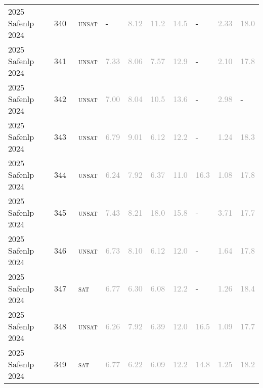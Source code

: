 \begin{center}
{\begin{longtable}{@{}llllllllll@{}}
2025 Safenlp 2024 & 340 & ~\textsc{unsat} & - & \textcolor{darkgray}{8.12} & \textcolor{darkgray}{11.2} & \textcolor{darkgray}{14.5} & - & \textcolor{darkgray}{2.33} & \textcolor{darkgray}{18.0} \\
2025 Safenlp 2024 & 341 & ~\textsc{unsat} & \textcolor{darkgray}{7.33} & \textcolor{darkgray}{8.06} & \textcolor{darkgray}{7.57} & \textcolor{darkgray}{12.9} & - & \textcolor{darkgray}{2.10} & \textcolor{darkgray}{17.8} \\
2025 Safenlp 2024 & 342 & ~\textsc{unsat} & \textcolor{darkgray}{7.00} & \textcolor{darkgray}{8.04} & \textcolor{darkgray}{10.5} & \textcolor{darkgray}{13.6} & - & \textcolor{darkgray}{2.98} & - \\
2025 Safenlp 2024 & 343 & ~\textsc{unsat} & \textcolor{darkgray}{6.79} & \textcolor{darkgray}{9.01} & \textcolor{darkgray}{6.12} & \textcolor{darkgray}{12.2} & - & \textcolor{darkgray}{1.24} & \textcolor{darkgray}{18.3} \\
2025 Safenlp 2024 & 344 & ~\textsc{unsat} & \textcolor{darkgray}{6.24} & \textcolor{darkgray}{7.92} & \textcolor{darkgray}{6.37} & \textcolor{darkgray}{11.0} & \textcolor{darkgray}{16.3} & \textcolor{darkgray}{1.08} & \textcolor{darkgray}{17.8} \\
2025 Safenlp 2024 & 345 & ~\textsc{unsat} & \textcolor{darkgray}{7.43} & \textcolor{darkgray}{8.21} & \textcolor{darkgray}{18.0} & \textcolor{darkgray}{15.8} & - & \textcolor{darkgray}{3.71} & \textcolor{darkgray}{17.7} \\
2025 Safenlp 2024 & 346 & ~\textsc{unsat} & \textcolor{darkgray}{6.73} & \textcolor{darkgray}{8.10} & \textcolor{darkgray}{6.12} & \textcolor{darkgray}{12.0} & - & \textcolor{darkgray}{1.64} & \textcolor{darkgray}{17.8} \\
2025 Safenlp 2024 & 347 & ~\textsc{sat} & \textcolor{darkgray}{6.77} & \textcolor{darkgray}{6.30} & \textcolor{darkgray}{6.08} & \textcolor{darkgray}{12.2} & - & \textcolor{darkgray}{1.26} & \textcolor{darkgray}{18.4} \\
2025 Safenlp 2024 & 348 & ~\textsc{unsat} & \textcolor{darkgray}{6.26} & \textcolor{darkgray}{7.92} & \textcolor{darkgray}{6.39} & \textcolor{darkgray}{12.0} & \textcolor{darkgray}{16.5} & \textcolor{darkgray}{1.09} & \textcolor{darkgray}{17.7} \\
2025 Safenlp 2024 & 349 & ~\textsc{sat} & \textcolor{darkgray}{6.77} & \textcolor{darkgray}{6.22} & \textcolor{darkgray}{6.09} & \textcolor{darkgray}{12.2} & \textcolor{darkgray}{14.8} & \textcolor{darkgray}{1.25} & \textcolor{darkgray}{18.2} \\

\end{longtable}}
\end{center}
